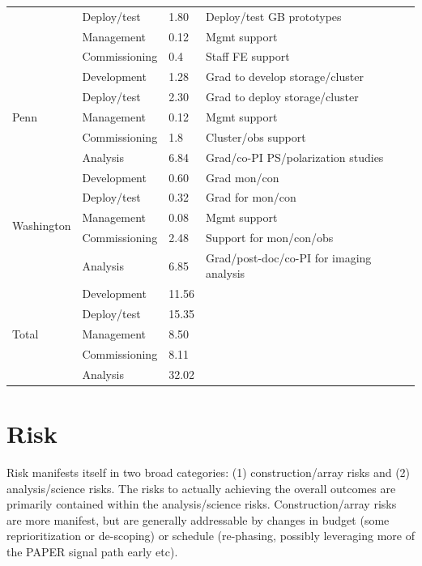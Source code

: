 \documentclass[preprint]{aastex}
\begin{document}
\begin{table}[t]
\begin{tabular}{| p{1in} | p{1in} | p{0.5in} | p{3in} |}
                                                & Deploy/test   & 1.80  & Deploy/test GB prototypes \\ 
                                                & Management  & 0.12  & Mgmt support\\ 
                                                & Commissioning & 0.4 & Staff FE support \\ \hline
\multirow{5}{*}{Penn}              & Development & 1.28 & Grad to develop storage/cluster \\ 
                                                & Deploy/test   & 2.30  & Grad to deploy storage/cluster\\
                                                & Management  &  0.12 & Mgmt support \\ 
                                                & Commissioning & 1.8 & Cluster/obs support \\ \hline
                                                & Analysis         & 6.84 & Grad/co-PI PS/polarization studies \\ 
\multirow{5}{*}{Washington} & Development & 0.60 & Grad mon/con \\
                                                & Deploy/test   & 0.32 & Grad for mon/con \\ 
                                                & Management  &  0.08 & Mgmt support \\ 
                                                & Commissioning     & 2.48 & Support for mon/con/obs \\ \hline
                                                & Analysis         & 6.85 & Grad/post-doc/co-PI for imaging analysis \\ 
\multirow{5}{*}{Total} & Development & 11.56 &  \\
                                                & Deploy/test   & 15.35 &  \\ 
                                                & Management  &  8.50 &  \\ 
                                                & Commissioning   & 8.11 &  \\ \hline
                                                & Analysis         & 32.02 &  \\ 
\end{tabular}
\end{table}

\section{Risk}
\label{sec:risk}
Risk manifests itself in two broad categories: (1) construction/array risks and (2)
analysis/science risks. The risks to actually achieving the overall outcomes are
primarily contained within the analysis/science risks. Construction/array risks are
more manifest, but are generally addressable by changes in budget (some
reprioritization or de-scoping) or schedule (re-phasing, possibly leveraging more of
the PAPER signal path early etc).
\end{document}
